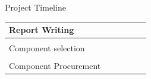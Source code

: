 \documentclass[aspectratio=169]{beamer}
\begin{document}
\begin{frame}{Project Timeline}
\begin{table}[]
\begin{adjustbox}{totalheight=\baselineskip,center}
\begin{tabular}{|l|l|l|l|l|l|}
						\multirow{-2}{*}{Report Writing} &
						&
						&
						&
						&
						\\ \hline
						&
						&
						&
						&
						\cellcolor[HTML]{93C47D} &
						\cellcolor[HTML]{93C47D} \\ \cline{2-6} 
						\multirow{-2}{*}{Component selection} &
						&
						&
						&
						\cellcolor[HTML]{6D9EEB} &
						\\ \hline
						&
						&
						&
						&
						&
						\cellcolor[HTML]{93C47D} \\ \cline{2-6} 
						\multirow{-2}{*}{Component Procurement} &
						&
						&
						&
						&
						\\ \hline
					\end{tabular}
				\end{adjustbox}
			\end{table}
		\end{frame}
		
		
		
\end{document}
